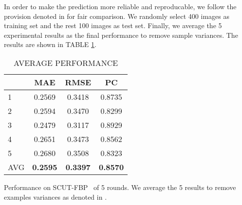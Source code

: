 \documentclass[a4paper,conference]{IEEEtran}
\begin{document}
    In order to make the prediction more reliable and reproducable,
    we follow the provision denoted in \cite{xie2015scut} for fair comparison.
    We randomly select 400 images as training set and the rest 100 images as
    test set. Finally, we average the 5 experimental results as the final
    performance to remove sample variances. The results are shown in
    TABLE \ref{avg performance}.
    \begin{table}[!htb]
      \caption{AVERAGE PERFORMANCE}
      \label{avg performance}
      \begin{center}
        \begin{tabular}{ l | c c c }
        \hline
          & \textbf{MAE} & \textbf{RMSE} & \textbf{PC} \\ \hline\hline
        1 & 0.2569 & 0.3418 & 0.8735 \\
        2 & 0.2594 & 0.3470 & 0.8299 \\
        3 & 0.2479 & 0.3117 & 0.8929 \\
        4 & 0.2651 & 0.3473 & 0.8562 \\
        5 & 0.2680 & 0.3508 & 0.8323 \\ \hline
        AVG & \textbf{0.2595} & \textbf{0.3397} & \textbf{0.8570}\\
        \hline
        \end{tabular}
        \begin{tablenotes}
          \footnotesize
          Performance on SCUT-FBP~\cite{xie2015scut} of 5 rounds. We average
          the 5 results to remove examples variances as denoted in \cite{xie2015scut}.
        \end{tablenotes}
      \end{center}
    \end{table}
\end{document}
